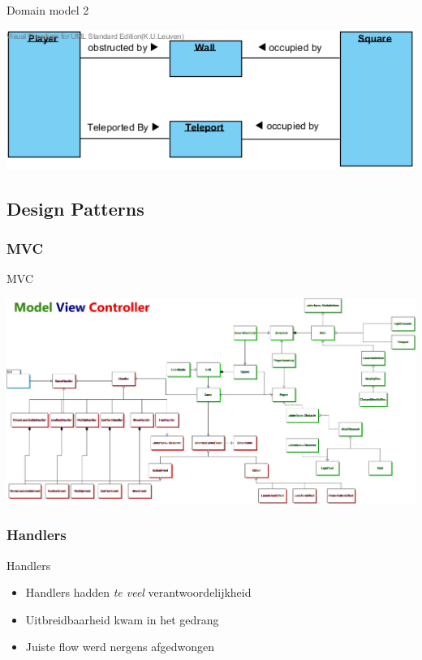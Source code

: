 \documentclass[t]{beamer}
\begin{document}
\begin{frame}{Domain model 2}
\begin{center}
\vspace{0.5in}
\includegraphics[scale=0.5]{images/DomainModel2}
\end{center}
\end{frame}

\subsection{Design Patterns}

\subsubsection{MVC}

\begin{frame}{MVC}
\begin{center}
\includegraphics[width=1\linewidth]{images/overview}
\end{center}
\end{frame}

\subsubsection{Handlers}

\begin{frame}{Handlers}
\begin{center}
\end{center}
\begin{itemize}
	\item Handlers hadden \textit{te veel} verantwoordelijkheid
	\item Uitbreidbaarheid kwam in het gedrang
	\item Juiste flow werd nergens afgedwongen
\end{itemize}
\end{frame}
\end{document}

